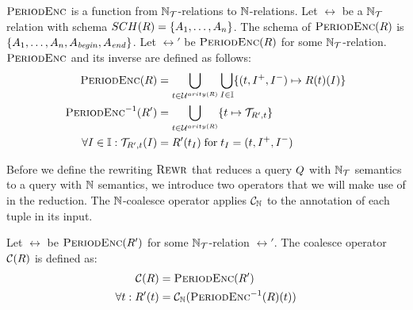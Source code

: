 \begin{defi}\label{def:N-enc}
 $\textsc{PeriodEnc}$ is a function from ${{\mathbb{N}}}_{\mathcal{T}}$-relations to ${\mathbb{N}}$-relations.   Let $\rel$ be a ${{\mathbb{N}}}_{\mathcal{T}}$ relation with schema $SCH(R) = \{A_1, \ldots, A_n\}$. The schema of $\textsc{PeriodEnc}(R)$ is $\{A_1, \ldots, A_n, A_\mathit{begin}, A_\mathit{end}\}$.
  Let $\rel'$ be $\textsc{PeriodEnc}(R)$ for some ${{\mathbb{N}}}_{\mathcal{T}}$-relation.
  $\textsc{PeriodEnc}$ and its inverse are defined as follows:
  \vspace{-3mm}
  \begin{align*}
    \textsc{PeriodEnc}(R) &= \bigcup_{t \in \mathcal{U}^{arity(R)}} \bigcup_{I \in \mathbb{I}} \{ (t, {I}^+, {I}^-) \mapsto R(t)(I) \}\\
    \textsc{PeriodEnc}^{-1}(R') &= \bigcup_{t \in \mathcal{U}^{arity(R)}} \{ t \mapsto \mathcal{T}_{R',t} \}\\
  \forall I \in \mathbb{I}:  \mathcal{T}_{R',t}(I) &= R'(t_{I}) \thickspace\text{for}\thickspace t_{I} = (t, {I}^+, {I}^-)
  \end{align*}
\end{defi}

Before we define the rewriting $\textsc{Rewr}$ that reduces a query
$Q$ with ${{\mathbb{N}}}_{\mathcal{T}}$ semantics to a query with ${\mathbb{N}}$
semantics, we introduce two operators that we will make use of in the
reduction. The ${\mathbb{N}}$-coalesce operator applies $\mathcal{C}_{{{\mathbb{N}}}}$
to the annotation of each tuple in its input.

\begin{defi}\label{def:coalesce-op}
Let $\rel$ be $\textsc{PeriodEnc}(R')$ for some ${{\mathbb{N}}}_{\mathcal{T}}$-relation $\rel'$.
The coalesce operator $\mathcal{C}(R)$ is defined as:
  \begin{align*}
    \mathcal{C}(R) &= \textsc{PeriodEnc}(R')\\
  \forall t: R'(t) &= \mathcal{C}_{{{\mathbb{N}}}}(\textsc{PeriodEnc}^{-1}(R)(t))
  \end{align*}
\end{defi}

